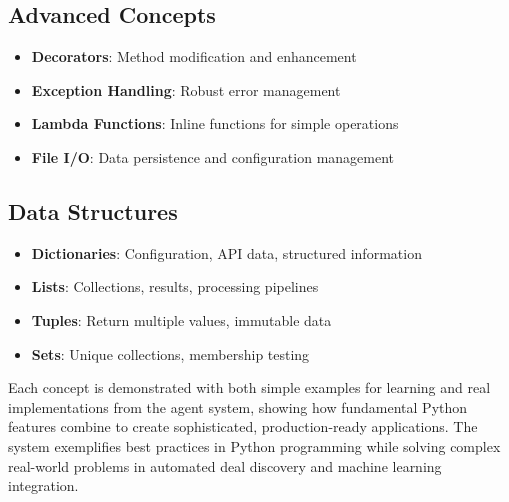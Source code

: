 \subsection{Advanced Concepts}
\begin{itemize}
\item \textbf{Decorators}: Method modification and enhancement
\item \textbf{Exception Handling}: Robust error management
\item \textbf{Lambda Functions}: Inline functions for simple operations
\item \textbf{File I/O}: Data persistence and configuration management
\end{itemize}

\subsection{Data Structures}
\begin{itemize}
\item \textbf{Dictionaries}: Configuration, API data, structured information
\item \textbf{Lists}: Collections, results, processing pipelines
\item \textbf{Tuples}: Return multiple values, immutable data
\item \textbf{Sets}: Unique collections, membership testing
\end{itemize}

Each concept is demonstrated with both simple examples for learning and real implementations from the agent system, showing how fundamental Python features combine to create sophisticated, production-ready applications. The system exemplifies best practices in Python programming while solving complex real-world problems in automated deal discovery and machine learning integration.